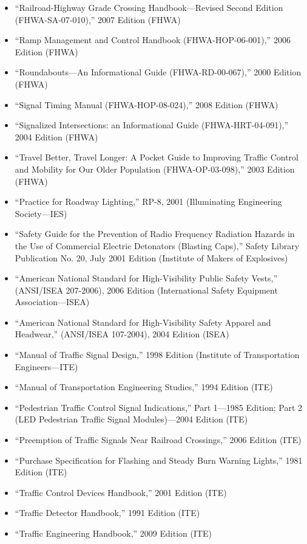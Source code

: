 \documentclass[9pt]{memoir}
\begin{document}
{\begin{itemize}
\item ``Railroad-Highway Grade Crossing Handbook---Revised Second Edition (FHWA-SA-07-010),'' 2007 Edition (FHWA)
\item ``Ramp Management and Control Handbook (FHWA-HOP-06-001),'' 2006 Edition (FHWA)
\item ``Roundabouts---An Informational Guide (FHWA-RD-00-067),'' 2000 Edition (FHWA)
\item ``Signal Timing Manual (FHWA-HOP-08-024),'' 2008 Edition (FHWA)
\item ``Signalized Intersections: an Informational Guide (FHWA-HRT-04-091),'' 2004 Edition (FHWA)
\item ``Travel Better, Travel Longer: A Pocket Guide to Improving Traffic Control and Mobility for Our Older Population (FHWA-OP-03-098),'' 2003 Edition (FHWA)
\item ``Practice for Roadway Lighting,'' RP-8, 2001 (Illuminating Engineering Society---IES)
\item ``Safety Guide for the Prevention of Radio Frequency Radiation Hazards in the Use of Commercial Electric Detonators (Blasting Caps),'' Safety Library Publication No. 20, July 2001 Edition (Institute of Makers of Explosives)
\item ``American National Standard for High-Visibility Public Safety Vests,'' (ANSI/ISEA 207-2006), 2006 Edition (International Safety Equipment Association---ISEA)
\item ``American National Standard for High-Visibility Safety Apparel and Headwear,'' (ANSI/ISEA 107-2004), 2004 Edition (ISEA)
\item ``Manual of Traffic Signal Design,'' 1998 Edition (Institute of Transportation Engineers---ITE)
\item ``Manual of Transportation Engineering Studies,'' 1994 Edition (ITE)
\item ``Pedestrian Traffic Control Signal Indications,'' Part 1---1985 Edition; Part 2 (LED Pedestrian Traffic Signal Modules)---2004 Edition (ITE)
\item ``Preemption of Traffic Signals Near Railroad Crossings,'' 2006 Edition (ITE)
\item ``Purchase Specification for Flashing and Steady Burn Warning Lights,'' 1981 Edition (ITE)
\item ``Traffic Control Devices Handbook,'' 2001 Edition (ITE)
\item ``Traffic Detector Handbook,'' 1991 Edition (ITE)
\item ``Traffic Engineering Handbook,'' 2009 Edition (ITE)

\end{itemize}}
\end{document}
